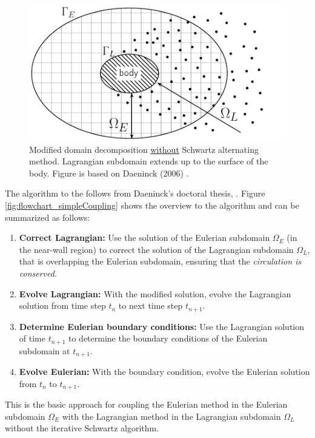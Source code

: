 	\begin{figure}[!t]
		\centering
		\includegraphics[width=0.6\linewidth]{figures/introduction/domainDecomposition_daenick_type2.pdf}
		\caption{Modified domain decomposition \underline{without} Schwartz alternating method. Lagrangian subdomain extends up to the surface of the body. Figure is based on Daeninck (2006) \cite{Daeninck2006}.}
		\label{fig:domainDecomposition_daenick}
	\end{figure}

The algorithm to the  follows from Daeninck's doctoral thesis, \cite{Daeninck2006}. Figure \ref{fig:flowchart_simpleCoupling} shows the overview to the algorithm and can be summarized as follows:

	\begin{enumerate}
	\item \textbf{Correct Lagrangian:} Use the solution of the Eulerian subdomain $\Omega_E$ (in the near-wall region) to correct the solution of the Lagrangian subdomain $\Omega_L$, that is overlapping the Eulerian subdomain, ensuring that the \textit{circulation is conserved}.  
	
	\item \textbf{Evolve Lagrangian:} With the modified solution, evolve the Lagrangian solution from time step $t_n$ to next time step $t_{n+1}$.
	
	\item \textbf{Determine Eulerian boundary conditions:} Use the Lagrangian solution of time $t_{n+1}$ to determine the boundary conditions of the Eulerian subdomain at $t_{n+1}$.
	
	\item \textbf{Evolve Eulerian:} With the boundary condition, evolve the Eulerian solution from $t_n$ to $t_{n+1}$.
	\end{enumerate}
	
This is the basic approach for coupling the Eulerian method in the Eulerian subdomain $\Omega_E$ with the Lagrangian method in the Lagrangian subdomain $\Omega_L$ without the iterative Schwartz algorithm. 


